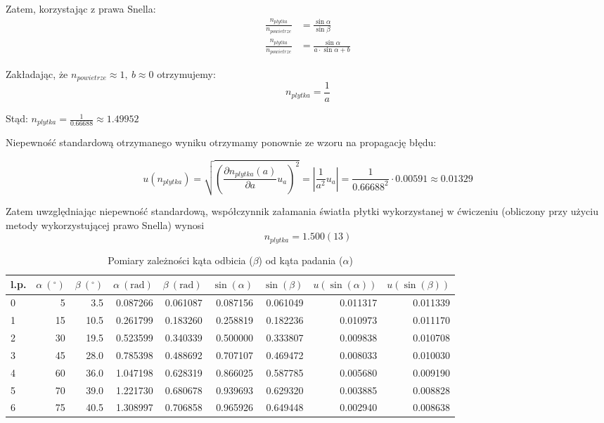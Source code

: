 \documentclass[a4paper]{article}
\newlength{\du}
\begin{document}
Zatem, korzystając z prawa Snella:
\begin{align*}
\frac{n_{plytka}}{n_{powietrze}} &= \frac{\sin\alpha}{\sin\beta} \\ 
\frac{n_{plytka}}{n_{powietrze}} &= \frac{\sin\alpha}{a \cdot \sin\alpha + b}
\end{align*}

Zakładając, że $n_{powietrze} \approx 1, \ b \approx 0$ otrzymujemy:
\[ n_{plytka} = \frac{1}{a}\]

Stąd: $n_{plytka} = \frac{1}{0.66688} \approx 1.49952$

Niepewność standardową otrzymanego wyniku otrzymamy ponownie ze wzoru na propagację błędu:

\[
		u(n_{plytka}) = \sqrt{\left(\frac{\partial n_{plytka}(a)}{\partial a}u_{a}\right)^2} = 
		\left| \frac{1}{a^2} u_{a}\right| = \frac{1}{0.66688^2}\cdot 0.00591 \approx 0.01329
\]

Zatem uwzględniając niepewność standardową, współczynnik załamania światła płytki wykorzystanej w ćwiczeniu (obliczony przy użyciu metody wykorzystującej prawo Snella) wynosi \[ n_{plytka} = 1.500(13)\]
\begin{table}[h!]
\centering
\begin{tabular}{lrrrrrrrr}
\toprule

l.p.&  $\alpha \ ({}^\circ)$ & $\beta \ ({}^\circ)$ &  $\alpha \ (\text{rad})$ &  $\beta \ (\text{rad})$ &  $\sin(\alpha)$ &  $\sin(\beta)$ &  $u(\sin(\alpha))$ &  $u(\sin(\beta))$ \\
\midrule
0 &           5 &         3.5 &    0.087266 &    0.061087 &   0.087156 &   0.061049 &  0.011317 &  0.011339 \\
1 &          15 &        10.5 &    0.261799 &    0.183260 &   0.258819 &   0.182236 &  0.010973 &  0.011170 \\
2 &          30 &        19.5 &    0.523599 &    0.340339 &   0.500000 &   0.333807 &  0.009838 &  0.010708 \\
3 &          45 &        28.0 &    0.785398 &    0.488692 &   0.707107 &   0.469472 &  0.008033 &  0.010030 \\
4 &          60 &        36.0 &    1.047198 &    0.628319 &   0.866025 &   0.587785 &  0.005680 &  0.009190 \\
5 &          70 &        39.0 &    1.221730 &    0.680678 &   0.939693 &   0.629320 &  0.003885 &  0.008828 \\
6 &          75 &        40.5 &    1.308997 &    0.706858 &   0.965926 &   0.649448 &  0.002940 &  0.008638 \\
\bottomrule
\end{tabular}

\caption{Pomiary zależności kąta odbicia ($\beta$) od kąta padania ($\alpha$)}
\label{snell-pomiary}
\end{table}
\end{document}
